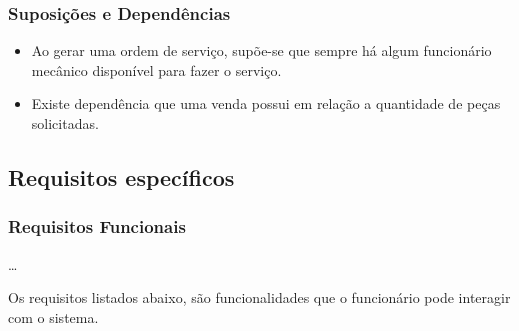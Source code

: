 	
	\subsubsection{Suposições e Dependências}
		\begin{itemize}
			\item Ao gerar uma ordem  de serviço, supõe-se que sempre há algum funcionário mecânico disponível para fazer o serviço.
			\item Existe dependência que uma venda possui em relação a quantidade de peças solicitadas.			
		\end{itemize}
	
	
\subsection{Requisitos específicos}

\subsubsection{Requisitos Funcionais}
\ldots

\par
Os requisitos listados abaixo, são funcionalidades que o funcionário pode interagir com o sistema.

